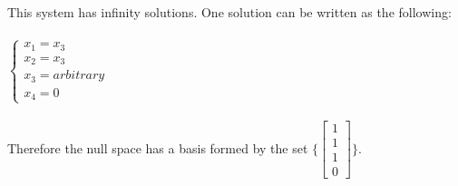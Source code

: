\documentclass[fleqn]{article}
\begin{document}
\begin{enumerate}
{        This system has infinity solutions. One solution can be written as the following:
        \\
        \\
        $
          \begin{cases}
            x_1=x_3
            \\
            x_2=x_3
            \\
            x_3=arbitrary
            \\
            x_4=0
          \end{cases}
        $
        \\
        \\
        Therefore the null space has a basis formed by the set 
        $
          \{
            \begin{bmatrix}
              1
              \\
              1
              \\
              1
              \\
              0
            \end{bmatrix}
          \} 
        $.
      }

  \end{enumerate}
\end{document}

